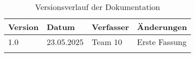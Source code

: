 \documentclass{scrarticle}                %
\begin{document}
\begin{longtable}{|p{2cm}|p{3cm}|p{3cm}|p{5cm}|}
	\hline
	\textbf{Version} & \textbf{Datum} & \textbf{Verfasser} & \textbf{Änderungen} \\
	\hline
	1.0              & 23.05.2025     & Team 10            & Erste Fassung                 \\
	\hline
	\caption{Versionsverlauf der Dokumentation}
\end{longtable}

\newpage


\thispagestyle{nofooter}
\newpage

%

\tableofcontents
\thispagestyle{nofooter}
\newpage

\setcounter{page}{1}


\newpage

%


\newpage


\newpage


\newpage


\newpage


\newpage
\end{document}
